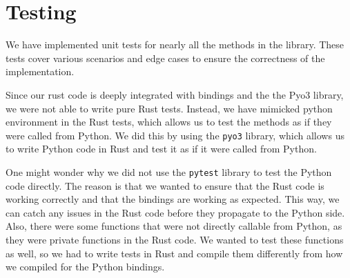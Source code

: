 \documentclass[review]{AIM_report}
\begin{document}
\newpage
\section{Testing}
We have implemented unit tests for nearly all the methods in the library. These tests cover various scenarios and edge cases to ensure the correctness of the implementation.

Since our rust code is deeply integrated with bindings and the the Pyo3 library, we were not able to write pure Rust tests. Instead, we have mimicked python environment in the Rust tests, which allows us to test the methods as if they were called from Python.
We did this by using the \texttt{pyo3} library, which allows us to write Python code in Rust and test it as if it were called from Python.

One might wonder why we did not use the \texttt{pytest} library to test the Python code directly. The reason is that we wanted to ensure that the Rust code is working correctly and that the bindings are working as expected. This way, we can catch any issues in the Rust code before they propagate to the Python side.
Also, there were some functions that were not directly callable from Python, as they were private functions in the Rust code. We wanted to test these functions as well, so we had to write tests in Rust and compile them differently from how we compiled for the Python bindings.
\end{document}
